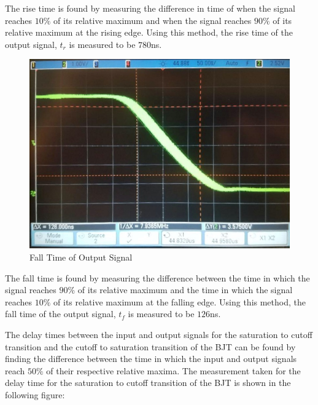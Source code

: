The rise time is found by measuring the difference in time of when the signal reaches $10\%$ of its relative maximum and when the signal reaches $90\%$ of its relative maximum at the rising edge. Using this method, the rise time of the output signal, $t_r$ is measured to be $780$\si{\nano\second}.

\FloatBarrier
\begin{figure}[h!]
	\centering
	\includegraphics[scale=0.34]{./images/inverter_tf.jpeg}
	\caption{Fall Time of Output Signal}
	\label{fig:inverter_tf}
\end{figure}
\FloatBarrier

The fall time is found by measuring the difference between the time in which the signal reaches $90\%$ of its relative maximum and the time in which the signal reaches $10\%$ of its relative maximum at the falling edge. Using this method, the fall time of the output signal, $t_f$ is measured to be $126$\si{\nano\second}.

The delay times between the input and output signals for the saturation to cutoff transition and the cutoff to saturation transition of the BJT can be found by finding the difference between the time in which the input and output signals reach $50\%$ of their respective relative maxima. The measurement taken for the delay time for the saturation to cutoff transition of the BJT is shown in the following figure:

